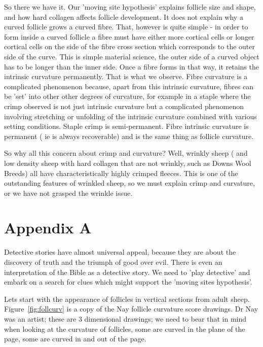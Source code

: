 \documentclass[titlepage]{article}  %
\begin{document}
So there we have it. Our 'moving site hypothesis' explains  follicle size and shape, and how hard collagen affects follicle development. It does not explain why a curved follicle grows a curved fibre. That, however is quite simple - in order to form inside a curved follicle a fibre must have either more cortical cells or longer cortical cells on the side of the fibre cross section which corresponds to the outer side of the curve. This is simple material science, the outer side of a curved object has to be longer than the inner side. Once a fibre forms in  that way, it retains the intrinsic curvature permanently. That is what we observe. Fibre curvature is a complicated phenomenon because, apart from this intrinsic curvature, fibres can be 'set' into other other degrees of curvature, for example in a staple where the crimp observed is not just intrinsic curvature but a complicated phenomenon involving stretching or unfolding of the intrinsic curvature combined with various setting conditions. Staple crimp is semi-permanent. Fibre intrinsic curvature is permanent ( ie is always recoverable) and is the same thing as follicle curvature.

So why all this concern about crimp and curvature? Well, wrinkly sheep ( and  low density sheep with hard collagen that are not wrinkly, such as Downs Wool Breeds)  all have characteristically highly crimped fleeces. This is one of the outstanding features of wrinkled sheep, so we must explain crimp and curvature, or we have not grasped the wrinkle issue.

\appendix
\section{Appendix A}
Detective stories have almost universal appeal, because they are about the discovery of truth and the triumph of good over evil.  There is even an interpretation of the Bible as a detective story. We need to 'play detective' and embark on a search for clues which might support the 'moving sites hypothesis'.

Lets start with the appearance of follicles in vertical sections from adult sheep. Figure~\ref{fig:follcurv} is a copy of the Nay follicle curvature score drawings. Dr Nay was an artist; these are 3 dimensional drawings; we need to bear that in mind when looking at the curvature of follicles, some are curved in the plane of the page, some are curved in and out of the page. 

\end{document}
